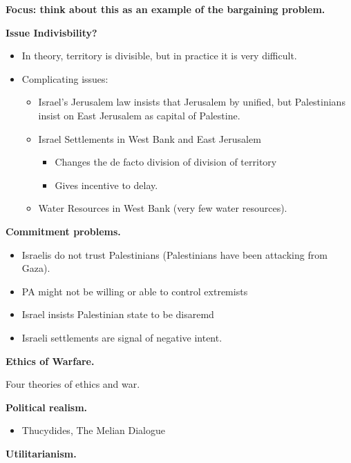 \documentclass{article}
\begin{document}
{\bf Focus: think about this as an example of the bargaining problem.}

{\bf Issue Indivisbility?}

\begin{itemize}
  \item  In theory, territory is divisible, but in practice it is very difficult.
  \item Complicating issues:
    \begin{itemize}
      \item Israel's Jerusalem law insists that Jerusalem by unified, but Palestinians insist on East Jerusalem as capital of Palestine.
      \item Israel Settlements in West Bank and East Jerusalem
        \begin{itemize}
          \item Changes the de facto division of division of territory
          \item Gives incentive to delay.  
        \end{itemize}
      \item Water Resources in West Bank (very few water resources).
    \end{itemize}
\end{itemize}

{\bf Commitment problems.}

\begin{itemize}
  \item Israelis do not trust Palestinians (Palestinians have been attacking from Gaza).
  \item PA might not be willing or able to control extremists
\end{itemize}

\begin{itemize}
  \item Israel insists Palestinian state to be disaremd
  \item Israeli settlements are signal of negative intent.
\end{itemize}

{\bf Ethics of Warfare.}

Four theories of ethics and war.

{\bf Political realism.}

\begin{itemize}
  \item Thucydides, The Melian Dialogue
\end{itemize}

{\bf Utilitarianism.}
\end{document}
